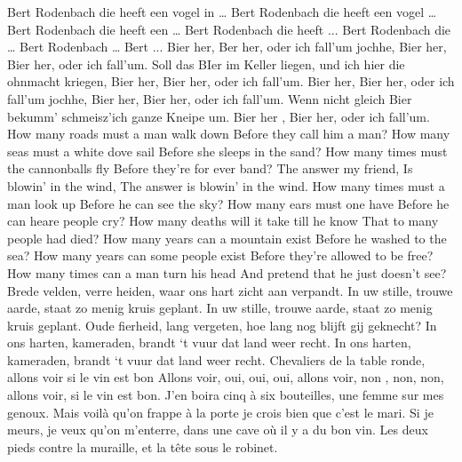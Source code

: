\documentclass{article}
\begin{document}
\begin{songs}{}
\endverse
\beginverse
Bert Rodenbach die heeft een vogel in …
\endverse
\beginverse
Bert Rodenbach die heeft een vogel …
\endverse
\beginverse
Bert Rodenbach die heeft een …
\endverse
\beginverse
Bert Rodenbach die heeft ...
\endverse
\beginverse
Bert Rodenbach die …
\endverse
\beginverse
Bert Rodenbach …
\endverse
\beginverse
Bert ...
\endverse
\endsong
{}
\beginverse*
Bier her, Ber her, 
oder ich fall’um jochhe,
Bier her, Bier her,
oder ich fall’um.
Soll das BIer im Keller liegen,
und ich hier die ohnmacht kriegen,
Bier her, Bier her,
oder ich fall’um.
\endverse
\beginverse*
Bier her, Bier her,
oder ich fall’um jochhe,
Bier her, Bier her,
oder ich fall’um.
Wenn nicht gleich Bier bekumm’
schmeisz’ich ganze Kneipe um.
Bier her , Bier her,
oder ich fall’um.
\endverse
\endsong
{}
\beginverse
How many roads must a man walk down
Before they call him a man?
How many seas must a white dove sail
Before she sleeps in the sand?
How many times must the cannonballs fly
Before they're for ever band?
\endverse
\beginchorus
The answer my friend,
Is blowin' in the wind,
The answer is blowin' in the wind.
\endchorus
\beginverse
How many times must a man look up
Before he can see the sky?
How many ears must one have
Before he can heare people cry?
How many deaths will it take till he know
That to many people had died?
\endverse
\beginverse
How many years can a mountain exist
Before he washed to the sea?
How many years can some people exist
Before they're allowed to be free?
How many times can a man turn his head
And pretend that he just doesn't see?
\endverse
\endsong
{}
\beginverse*
Brede velden, verre heiden,
waar ons hart zicht aan verpandt.
In uw stille, trouwe aarde,
staat zo menig kruis geplant.
In uw stille, trouwe aarde,
staat zo menig kruis geplant.
\endverse
\beginverse*
Oude fierheid, lang vergeten,
hoe lang nog blijft gij geknecht?
In ons harten, kameraden,
brandt ‘t vuur dat land weer recht.
In ons harten, kameraden,
brandt ‘t vuur dat land weer recht.
\endverse
\endsong
{}
\beginverse
Chevaliers de la table ronde,
allons voir si le vin est bon
\endverse
\beginchorus
Allons voir, oui, oui, oui,
allons voir, non , non, non,
allons voir, si le vin est bon.
\endchorus
\beginverse
J’en boira cinq à six bouteilles,
une femme sur mes genoux.
Mais voilà qu’on frappe à la porte
je crois bien que c’est le mari.
\endverse
\beginverse
Si je meurs, je veux qu’on m’enterre,
dans une cave où il y a du bon vin.
Les deux pieds contre la muraille,
et la tête sous le robinet.

\end{songs}
\end{document}
